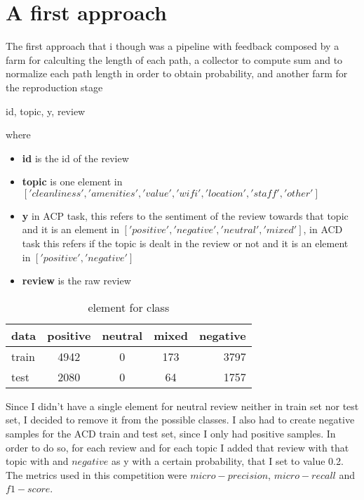 \documentclass{article}
\begin{document}
    \section{A first approach}\label{sec:s2}
	The first approach that i though was a pipeline with feedback composed by a farm for calculting the length of each path, a collector to compute sum and to normalize
	each path length in order to obtain probability, and another farm for the reproduction stage

        \centerline{id, topic, y, review}
        where
        \begin{itemize}
            \item \textbf{id} is the id of the review
            \item \textbf{topic} is one element in $['cleanliness', 'amenities', 'value', 'wifi', 'location', 'staff', 'other']$
            \item \textbf{y} in ACP task, this refers to the sentiment of the review towards that topic and it is an element in $['positive', 'negative', 'neutral', 'mixed']$, in ACD task this refers if the topic is dealt in the review or not and it is an element in $['positive', 'negative']$
            \item \textbf{review} is the raw review
        \end{itemize}
        \begin{table}[h!]
            \begin{center}
                \caption{element for class}
                \label{tab:table1}
                \begin{tabular}{l|c|c|c|r}
                    \textbf{data} & \textbf{positive} & \textbf{neutral} & \textbf{mixed} & \textbf{negative}\\
                    \hline
                        train & 4942 & 0 & 173 & 3797\\
                        test & 2080 & 0 & 64 & 1757\\
                \end{tabular}
            \end{center}
        \end{table}
        Since I didn't have a single element for neutral review neither in train set nor test set, I decided to remove it from the possible classes.
        I also had to create negative samples for the ACD train and test set, since I only had positive samples.
        In order to do so, for each review and for each topic I added that review with that topic with and $negative$ as y with a certain probability, that I set to value 0.2.
        The metrics used in this competition were $micro-precision$, $micro-recall$ and $f1-score$.
\end{document}
